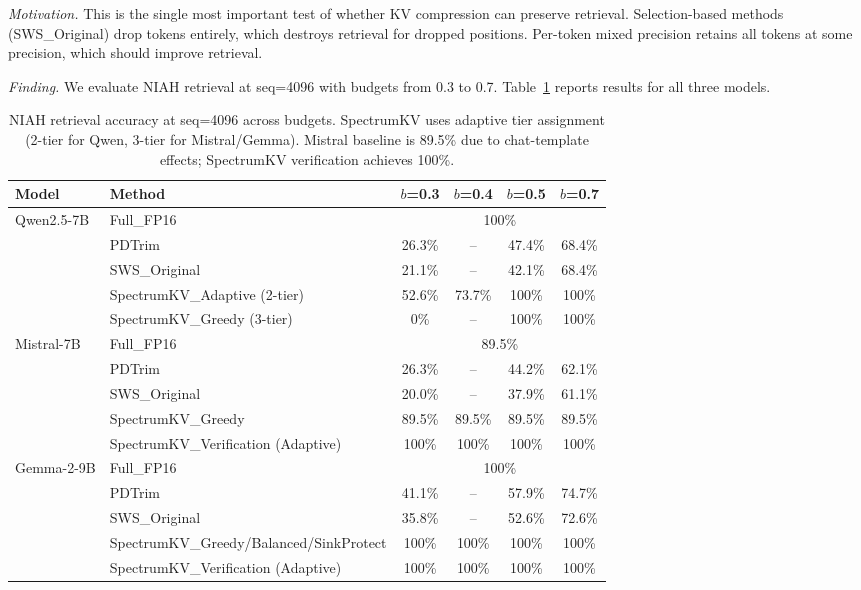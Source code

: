 \documentclass[11pt]{article}
\newcommand{\method}{SpectrumKV}
\newcommand{\ska}{SpectrumKV}
\newcommand{\pct}{\%}
\theoremstyle{definition}
\theoremstyle{plain}
\begin{document}
\emph{Motivation.}  This is the single most important test of whether KV compression can preserve retrieval.  Selection-based methods (SWS\_Original) drop tokens entirely, which destroys retrieval for dropped positions.  Per-token mixed precision retains all tokens at some precision, which should improve retrieval.

\emph{Finding.}  We evaluate NIAH retrieval at seq=4096 with budgets from 0.3 to 0.7.  Table~\ref{tab:niah} reports results for all three models.

\begin{table}[t]
\centering
\caption{NIAH retrieval accuracy at seq=4096 across budgets.  \method{} uses adaptive tier assignment (2-tier for Qwen, 3-tier for Mistral/Gemma).  Mistral baseline is 89.5\pct{} due to chat-template effects; \method{} verification achieves 100\pct{}.}
\label{tab:niah}
\small
\begin{tabular}{llcccc}
\toprule
Model & Method & $b$=0.3 & $b$=0.4 & $b$=0.5 & $b$=0.7 \\
\midrule
\multirow{5}{*}{Qwen2.5-7B} 
 & Full\_FP16 & \multicolumn{4}{c}{100\pct{}} \\
 & PDTrim & 26.3\pct{} & -- & 47.4\pct{} & 68.4\pct{} \\
 & SWS\_Original & 21.1\pct{} & -- & 42.1\pct{} & 68.4\pct{} \\
 & \ska{}\_Adaptive (2-tier) & 52.6\pct{} & 73.7\pct{} & 100\pct{} & 100\pct{} \\
 & \ska{}\_Greedy (3-tier) & 0\pct{} & -- & 100\pct{} & 100\pct{} \\
\midrule
\multirow{5}{*}{Mistral-7B} 
 & Full\_FP16 & \multicolumn{4}{c}{89.5\pct{}} \\
 & PDTrim & 26.3\pct{} & -- & 44.2\pct{} & 62.1\pct{} \\
 & SWS\_Original & 20.0\pct{} & -- & 37.9\pct{} & 61.1\pct{} \\
 & \ska{}\_Greedy & 89.5\pct{} & 89.5\pct{} & 89.5\pct{} & 89.5\pct{} \\
 & \ska{}\_Verification (Adaptive) & 100\pct{} & 100\pct{} & 100\pct{} & 100\pct{} \\
\midrule
\multirow{5}{*}{Gemma-2-9B} 
 & Full\_FP16 & \multicolumn{4}{c}{100\pct{}} \\
 & PDTrim & 41.1\pct{} & -- & 57.9\pct{} & 74.7\pct{} \\
 & SWS\_Original & 35.8\pct{} & -- & 52.6\pct{} & 72.6\pct{} \\
 & \ska{}\_Greedy/Balanced/SinkProtect & 100\pct{} & 100\pct{} & 100\pct{} & 100\pct{} \\
 & \ska{}\_Verification (Adaptive) & 100\pct{} & 100\pct{} & 100\pct{} & 100\pct{} \\
\bottomrule
\end{tabular}
\end{table}
\end{document}
